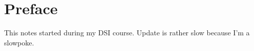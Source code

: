 \chapter{Preface}
This notes started during my DSI course. Update is rather slow because I'm a slowpoke.